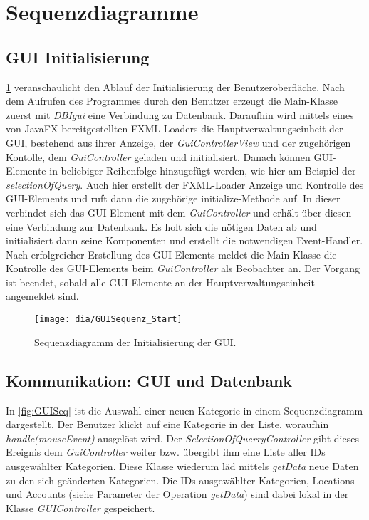 \section{Sequenzdiagramme}
\subsection{GUI Initialisierung}

\cref{fig:GUIStartSeq} veranschaulicht den Ablauf der Initialisierung der Benutzeroberfläche. Nach dem Aufrufen des Programmes durch den Benutzer erzeugt die Main-Klasse zuerst mit \emph{DBIgui} eine Verbindung zu Datenbank.
Daraufhin wird mittels eines von JavaFX bereitgestellten FXML-Loaders die Hauptverwaltungseinheit der GUI, bestehend aus ihrer Anzeige, der \emph{GuiControllerView} und der zugehörigen Kontolle, dem \emph{GuiController} geladen und initialisiert.
Danach können GUI-Elemente in beliebiger Reihenfolge hinzugefügt werden, wie hier am Beispiel der \emph{selectionOfQuery}.
Auch hier erstellt der FXML-Loader Anzeige und Kontrolle des GUI-Elements und ruft dann die zugehörige initialize-Methode auf.
In dieser verbindet sich das GUI-Element mit dem \emph{GuiController} und erhält über diesen eine Verbindung zur Datenbank. Es holt sich die nötigen Daten ab und initialisiert dann seine Komponenten und erstellt die notwendigen Event-Handler.
Nach erfolgreicher Erstellung des GUI-Elements meldet die  Main-Klasse die Kontrolle des GUI-Elements beim \emph{GuiController} als Beobachter an.
Der Vorgang ist beendet, sobald alle GUI-Elemente an der Hauptverwaltungseinheit angemeldet sind.

\begin{figure}[h!]
	\centering
	\texttt{[image: dia/GUISequenz\_Start]}
	\caption{Sequenzdiagramm der Initialisierung der GUI.}
	\label{fig:GUIStartSeq}
\end{figure}
\subsection{Kommunikation: GUI und Datenbank}
In \cref{fig:GUISeq} ist die Auswahl einer neuen Kategorie in einem Sequenzdiagramm dargestellt. Der Benutzer klickt auf eine Kategorie in der Liste, woraufhin \emph{handle(mouseEvent)} ausgelöst wird. Der \emph{SelectionOfQuerryController} gibt dieses Ereignis dem \emph{GuiController} weiter bzw. übergibt ihm eine Liste aller IDs ausgewählter Kategorien. Diese Klasse wiederum läd mittels \emph{getData} neue Daten zu den sich geänderten Kategorien. Die IDs ausgewählter Kategorien, Locations und Accounts (siehe Parameter der Operation \emph{getData}) sind dabei lokal in der Klasse \emph{GUIController} gespeichert.

